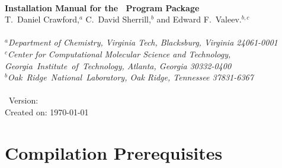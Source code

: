 \documentclass[12pt]{article}
\begin{document}


\begin{center}
\ \\
\vspace{2.0in}
{\bf {\Large Installation Manual for the \PSIthree\ Program Package}} \\
\vspace{0.5in}
T.\ Daniel Crawford,$^a$ C.\ David Sherrill,$^b$ and Edward F.\ Valeev.$^{b,c}$   \\
\ \\
{\em $^a$Department of Chemistry, Virginia Tech, Blacksburg, Virginia 24061-0001} \\
\vspace{0.1in}
{\em $^c$Center for Computational Molecular Science and Technology, \mbox{Georgia 
Institute of Technology,} Atlanta, Georgia 30332-0400} \\
\vspace{0.1in}
{\em $^b$\mbox{Oak Ridge National Laboratory,} Oak Ridge, Tennessee 37831-6367}\\
\ \\
\vspace{0.3in}
\PSIthree\ Version: \PSIversion \\
Created on: \today
\end{center}

\thispagestyle{empty}

\newpage
\section{Compilation Prerequisites}
\end{document}
